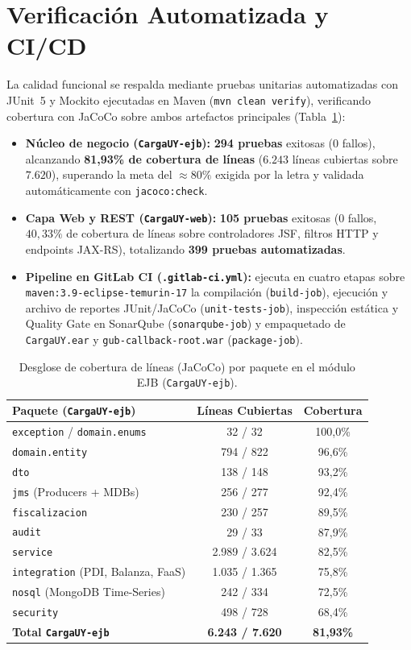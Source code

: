\documentclass[11pt,a4paper,twocolumn]{article}
\begin{document}
\section{Verificación Automatizada y CI/CD}\label{sec:ci}

La calidad funcional se respalda mediante pruebas unitarias automatizadas con JUnit~5 y Mockito ejecutadas en Maven (\texttt{mvn clean verify}), verificando cobertura con JaCoCo sobre ambos artefactos principales (Tabla~\ref{tab:jacoco}):
\begin{itemize}
    \item \textbf{Núcleo de negocio (\texttt{CargaUY-ejb}):} \textbf{294 pruebas} exitosas ($0$ fallos), alcanzando \textbf{81{,}93\% de cobertura de líneas} ($6.243$ líneas cubiertas sobre $7.620$), superando la meta del $\approx 80\%$ exigida por la letra y validada automáticamente con \texttt{jacoco:check}.
    \item \textbf{Capa Web y REST (\texttt{CargaUY-web}):} \textbf{105 pruebas} exitosas ($0$ fallos, $40{,}33\%$ de cobertura de líneas sobre controladores JSF, filtros HTTP y endpoints JAX-RS), totalizando \textbf{399 pruebas automatizadas}.
    \item \textbf{Pipeline en GitLab CI (\texttt{.gitlab-ci.yml}):} ejecuta en cuatro etapas sobre \texttt{maven:3.9-eclipse-temurin-17} la compilación (\texttt{build-job}), ejecución y archivo de reportes JUnit/JaCoCo (\texttt{unit-tests-job}), inspección estática y Quality Gate en SonarQube (\texttt{sonarqube-job}) y empaquetado de \texttt{CargaUY.ear} y \texttt{gub-callback-root.war} (\texttt{package-job}).
\end{itemize}

\begin{table}[t]
\centering
\caption{Desglose de cobertura de líneas (JaCoCo) por paquete en el módulo EJB (\texttt{CargaUY-ejb}).}
\label{tab:jacoco}
\scriptsize
\begin{tabular}{@{}lcc@{}}
\toprule
\textbf{Paquete (\texttt{CargaUY-ejb})} & \textbf{Líneas Cubiertas} & \textbf{Cobertura} \\
\midrule
\texttt{exception} / \texttt{domain.enums} & 32 / 32 & 100,0\% \\
\texttt{domain.entity} & 794 / 822 & 96,6\% \\
\texttt{dto} & 138 / 148 & 93,2\% \\
\texttt{jms} (Producers + MDBs) & 256 / 277 & 92,4\% \\
\texttt{fiscalizacion} & 230 / 257 & 89,5\% \\
\texttt{audit} & 29 / 33 & 87,9\% \\
\texttt{service} & 2.989 / 3.624 & 82,5\% \\
\texttt{integration} (PDI, Balanza, FaaS) & 1.035 / 1.365 & 75,8\% \\
\texttt{nosql} (MongoDB Time-Series) & 242 / 334 & 72,5\% \\
\texttt{security} & 498 / 728 & 68,4\% \\
\midrule
\textbf{Total \texttt{CargaUY-ejb}} & \textbf{6.243 / 7.620} & \textbf{81,93\%} \\
\bottomrule
\end{tabular}
\end{table}
\end{document}
